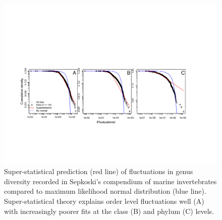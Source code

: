 \documentclass[12pt]{article}
\begin{document}
\begin{figure}[!hp]
  \centering
  \includegraphics[scale=0.6]{figs/figSupp_sepk_Px.pdf}
  \caption[Super-statistical prediction for Sepkoski's
  compendium]{Super-statistical prediction (red line) of fluctuations
    in genus diversity recorded in Sepkoski's compendium of marine
    invertebrates compared to maximum likelihood normal distribution
    (blue line). Super-statistical theory explains order level
    fluctuations well (A) with increasingly poorer fits at the class
    (B) and phylum (C) levels.}
  \label{fig:supp_sepkPx}
\end{figure}
\end{document}
